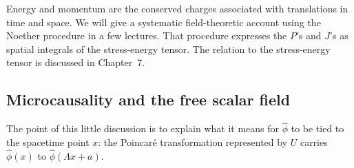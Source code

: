 Energy and momentum are the conserved charges associated with translations in
time and space.
We will give a systematic field-theoretic account using the Noether procedure in
a few lectures.
That procedure expresses the $P$'s and $J$'s as spatial integrals of the
stress-energy tensor.
The relation to the stress-energy tensor is discussed in Chapter~7.

\subsection{Microcausality and the free scalar field}
\label{sec:253a-microcausality}

The point of this little discussion is to explain what it means for $\hat\phi$
to be tied to the spacetime point $x$: the Poincaré
transformation represented by $U$ carries $\hat\phi(x)$ to $\hat\phi(\Lambda
x+a)$.

